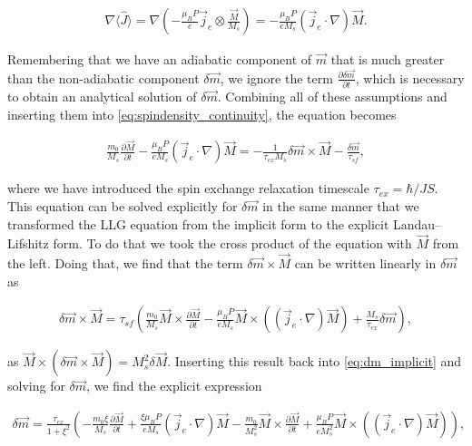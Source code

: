 \documentclass[1p]{elsarticle}		%
\numberwithin{equation}{section}
\begin{document}
\begin{align}
\nabla \langle \hat{J} \rangle = \nabla (-\frac{\mu_B P}{e} \vec{j}_e \otimes \frac{\vec{M}}{M_s}) = -\frac{\mu_B P}{e M_s} (\vec{j}_e \cdot \nabla) \vec{M}.
\end{align}

Remembering that we have an adiabatic component of $\vec{m}$ that is much greater than the non-adiabatic component $\delta\vec{m}$, we ignore the term $\frac{\partial \delta\vec{m}}{\partial t}$, which is necessary to obtain an analytical solution of $\delta \vec{m}$. Combining all of these assumptions and inserting them into \eqref{eq:spindensity_continuity}, the equation becomes 

\begin{align}
\label{eq:dm_implicit}
\frac{m_0}{M_s}\frac{\partial \vec{M}}{\partial t} - \frac{\mu_B P}{e M_s} (\vec{j}_e \cdot \nabla) \vec{M} = -\frac{1}{\tau_{ex} M_s} \delta\vec{m} \times \vec{M} - \frac{\delta\vec{m}}{\tau_{sf}},
\end{align}

where we have introduced the spin exchange relaxation timescale $\tau_{ex} = \hbar/JS$. This equation can be solved explicitly for $\delta\vec{m}$ in the same manner that we transformed the LLG equation from the implicit form to the explicit Landau--Lifshitz form. To do that we took the cross product of the equation with $\vec{M}$ from the left. Doing that, we find that the term $\delta\vec{m}\times\vec{M}$ can be written linearly in $\delta\vec{m}$ as

\begin{align}
\delta\vec{m} \times \vec{M} = \tau_{sf} (\frac{m_0}{M_s} \vec{M} \times \frac{\partial \vec{M}}{\partial t} - \frac{\mu_B P}{e M_s} \vec{M}\times((\vec{j}_e\cdot\nabla)\vec{M}) + \frac{M_s}{\tau_{ex}} \delta\vec{m}),
\end{align}

as $\vec{M} \times (\delta\vec{m}\times\vec{M}) = M_s^2\delta\vec{M}$. Inserting this result back into \eqref{eq:dm_implicit} and solving for $\delta\vec{m}$, we find the explicit expression

\begin{align}
\label{eq:dm_explicit}
\delta\vec{m} = \frac{\tau_{ex}}{1+\xi^2}(-\frac{m_0\xi}{M_s}\frac{\partial \vec{M}}{\partial t} + \frac{\xi \mu_B P}{e M_s}(\vec{j}_e\cdot\nabla)\vec{M} - \frac{m_0}{M_s^2}\vec{M}\times \frac{\partial \vec{M}}{\partial t} + \frac{\mu_B P}{e M_s^2}\vec{M}\times((\vec{j}_e\cdot\nabla)\vec{M})),
\end{align}
\end{document}
